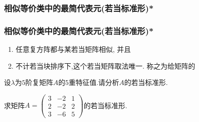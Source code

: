\subsubsection{相似等价类中的最简代表元(若当标准形)*}
\begin{frame}\frametitle{相似等价类中的最简代表元(若当标准形)*}
\begin{theorem}
\begin{enumerate}
\item 任意复方阵都与某若当矩阵相似,
\pp
并且
\item 不计若当块排序下,这个若当矩阵取法唯一.
\pp
称之为给矩阵的
\end{enumerate}
\end{theorem}
\pp
\begin{example}
设$\lambda$为$5$阶复矩阵$A$的$5$重特征值.请分析$A$的若当标准形.
\end{example}
\pp
\begin{example}
求矩阵$A=\begin{pmatrix}3&-2&1\\2&-2&2\\3&-6&5\end{pmatrix}$的若当标准形.
\end{example}

\yang{\[T^{-1}AT = \begin{pmatrix}2&1&\\&2&\\&&2\\\end{pmatrix}, \qquad T = \begin{pmatrix}
1 & 1 & -1 \\ 2 & 0 & 0 \\ 3 & 0 & 1 \\ \end{pmatrix}.\]}
\end{frame}





